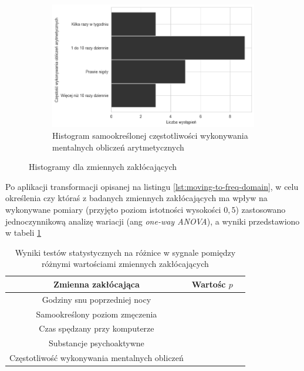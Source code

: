 \documentclass{./assets/wfis}
\begin{document}
\begin{figure}[h!]
\begin{subfigure}[b]{\textwidth}
    \includegraphics[width=0.75\columnwidth]{thesis/assets/mental_math.png}
    \caption{Histogram samookreślonej częstotliwości wykonywania mentalnych obliczeń arytmetycznych}
    \label{fig:arithmetic}
\end{subfigure}
\caption{Histogramy dla zmiennych zakłócających}
\end{figure}

Po aplikacji transformacji opisanej na listingu \ref{lst:moving-to-freq-domain}, w celu określenia czy któraś z badanych zmiennych zakłócających ma wpływ na wykonywane pomiary (przyjęto poziom istotności wysokości $0,5$) zastosowano jednoczynnikową analizę wariacji (ang \textit{one-way ANOVA}), a wyniki przedstawiono w tabeli \ref{tab:confunding-variables-statistical-tests} 

\begin{table}[h!]
    \centering
    \begin{tabular}{|c|c|c|}
        \hline
          Zmienna zakłócająca & Wartośc $p$\\
        \hline
         Godziny snu poprzedniej nocy & \\
         Samookreślony poziom zmęczenia &  \\
         Czas spędzany przy komputerze & \\
         Substancje psychoaktywne  & \\
         Częstotliwość wykonywania mentalnych obliczeń & \\
        \hline
    \end{tabular}
    \caption{Wyniki testów statystycznych na różnice w sygnale pomiędzy różnymi wartościami zmiennych zakłócających}
    \label{tab:confunding-variables-statistical-tests}
\end{table}

\end{document}
